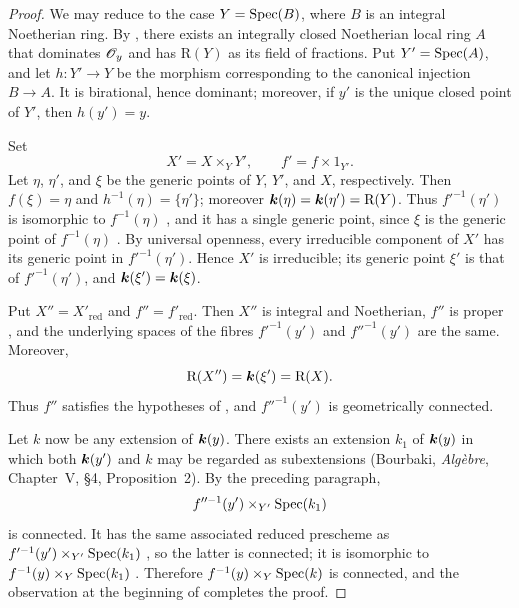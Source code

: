 \begin{proof}
We may reduce to the case $Y=\operatorname{Spec}(B)$, where $B$ is an integral
Noetherian ring.  By , there exists an integrally
closed Noetherian local ring $A$ that dominates $\mathscr{O}_y$ and has
$\mathrm{R}(Y)$ as its field of fractions.  Put $Y'=\operatorname{Spec}(A)$, and let
$h:Y'\to Y$ be the morphism corresponding to the canonical
injection $B\to A$.  It is birational, hence dominant; moreover, if
$y'$ is the unique closed point of $Y'$, then $h(y')=y$.

Set
\[
  X'=X\times_Y Y',
  \qquad
  f'=f\times 1_{Y'}.
\]
Let $\eta$, $\eta'$, and $\xi$ be the generic points of $Y$, $Y'$,
and $X$, respectively.  Then $f(\xi)=\eta$ and
$h^{-1}(\eta)=\{\eta'\}$; moreover
$\boldsymbol{k}(\eta)=\boldsymbol{k}(\eta')=\mathrm{R}(Y)$.  Thus $f'^{-1}(\eta')$ is
isomorphic to $f^{-1}(\eta)$ , and it has a single
generic point, since $\xi$ is the generic point of
$f^{-1}(\eta)$ .  By universal openness, every
irreducible component of $X'$ has its generic point in
$f'^{-1}(\eta')$.  Hence $X'$ is irreducible; its generic point
$\xi'$ is that of $f'^{-1}(\eta')$, and
$\boldsymbol{k}(\xi')=\boldsymbol{k}(\xi)$.


Put $X''=X'_{\mathrm{red}}$ and $f''=f'_{\mathrm{red}}$.  Then
$X''$ is integral and Noetherian, $f''$ is proper
, and the underlying spaces of the fibres
$f'^{-1}(y')$ and $f''^{-1}(y')$ are the same.  Moreover,
\[
  \mathrm{R}(X'')=\boldsymbol{k}(\xi')=\mathrm{R}(X).
\]
Thus $f''$ satisfies the hypotheses of , and
$f''^{-1}(y')$ is geometrically connected.

Let $k$ now be any extension of $\boldsymbol{k}(y)$.  There exists an
extension $k_1$ of $\boldsymbol{k}(y)$ in which both $\boldsymbol{k}(y')$ and $k$ may
be regarded as subextensions (Bourbaki, \emph{Alg\`ebre},
Chapter~V, \S4, Proposition~2).  By the preceding paragraph,
\[
  f''^{-1}(y')\times_{Y'}\operatorname{Spec}(k_1)
\]
is connected.  It has the same associated reduced prescheme as
$f'^{-1}(y')\times_{Y'}\operatorname{Spec}(k_1)$
, so the latter is connected; it is isomorphic to
$f^{-1}(y)\times_Y\operatorname{Spec}(k_1)$ .  Therefore
$f^{-1}(y)\times_Y\operatorname{Spec}(k)$ is connected, and the observation at the
beginning of  completes the proof.
\end{proof}

